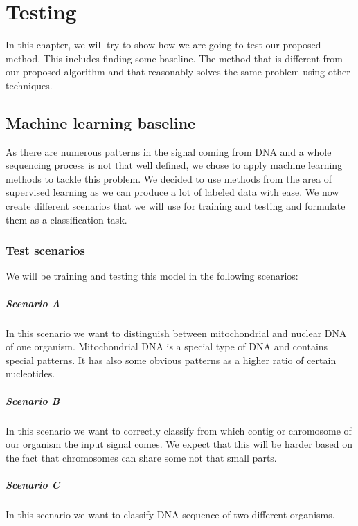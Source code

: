 \chapter{Testing}

\label{kap:testing} %

In this chapter, we will try to show how we are going to test our proposed method.
This includes finding some baseline. The method that is different from our proposed
algorithm and that reasonably solves the same problem using other techniques.

\section{Machine learning baseline}

As there are numerous patterns in the signal coming from DNA and a whole sequencing
process is not that well defined, we chose to apply machine learning methods to
tackle this problem. We decided to use methods from the area of supervised learning
as we can produce a lot of labeled data with ease. We now create different scenarios
that we will use for training and testing and formulate them as a classification task.

\subsection{Test scenarios}

We will be training and testing this model in the following scenarios:

\paragraph{Scenario A} In this scenario we want to distinguish between mitochondrial
and nuclear DNA of one organism. Mitochondrial DNA is a special type of DNA and
contains special patterns. It has also some obvious patterns as a higher ratio of
certain nucleotides.

\paragraph{Scenario B} In this scenario we want to correctly classify from which
contig or chromosome of our organism the input signal comes. We expect that this
will be harder based on the fact that chromosomes can share some not that small parts.

\paragraph{Scenario C} In this scenario we want to classify DNA sequence of two
different organisms.

